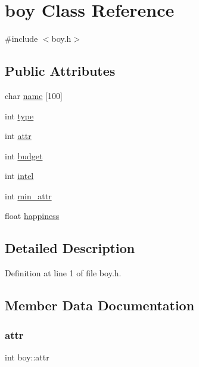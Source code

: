 \hypertarget{classboy}{}\section{boy Class Reference}
\label{classboy}


{\ttfamily \#include $<$boy.\+h$>$}

\subsection*{Public Attributes}
\begin{DoxyCompactItemize}
\item 
char \hyperlink{classboy_a703fa58417037fd55aaa45942fb550a5}{name} \mbox{[}100\mbox{]}
\item 
int \hyperlink{classboy_a53f19b290e6f6930623ca571a7d38e18}{type}
\item 
int \hyperlink{classboy_a1f5bd5201d830f7398b33f5330ab18d1}{attr}
\item 
int \hyperlink{classboy_a80d6bd6642a612cf0428ab56a2098316}{budget}
\item 
int \hyperlink{classboy_a71d1abd867065c974a0a5fc82816251e}{intel}
\item 
int \hyperlink{classboy_a49a62cdd558aba0ae0ed7d4b4a67e7e6}{min\+\_\+attr}
\item 
float \hyperlink{classboy_a69f63baff79a956ab252f98dfda681b9}{happiness}
\end{DoxyCompactItemize}


\subsection{Detailed Description}


Definition at line 1 of file boy.\+h.



\subsection{Member Data Documentation}
\mbox{\label{classboy_a1f5bd5201d830f7398b33f5330ab18d1}} 
\subsubsection{\texorpdfstring{attr}{attr}}
{\footnotesize\ttfamily int boy\+::attr}



